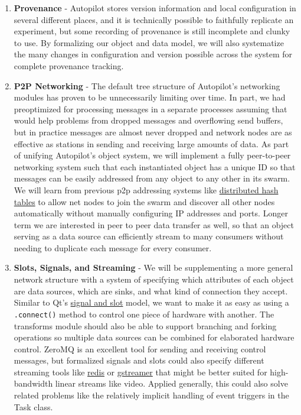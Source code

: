 \begin{enumerate}[ref=\thechapter.\arabic*]
    \item \label{future:provenance}\textbf{Provenance} - Autopilot stores version information and local configuration in several different places, and it is technically possible to faithfully replicate an experiment, but some recording of provenance is still incomplete and clunky to use. By formalizing our object and data model, we will also systematize the many changes in configuration and version possible across the system for complete provenance tracking.
    \item \label{future:network}\textbf{P2P Networking} - The default tree structure of Autopilot's networking modules has proven to be unnecessarily limiting over time. In part, we had preoptimized for processing messages in a separate processes assuming that would help problems from dropped messages and overflowing send buffers, but in practice messages are almost never dropped and network nodes are as effective as stations in sending and receiving large amounts of data. As part of unifying Autopilot's object system, we will implement a fully peer-to-peer networking system such that each instantiated object has a unique ID so that messages can be easily addressed from any object to any other in its swarm. We will learn from previous p2p addressing systems like \href{https://en.wikipedia.org/wiki/Distributed\_hash\_table}{distributed hash tables} to allow net nodes to join the swarm and discover all other nodes automatically without manually configuring IP addresses and ports. Longer term we are interested in peer to peer data transfer as well, so that an object serving as a data source can efficiently stream to many consumers without needing to duplicate each message for every consumer.
    \item \label{future:slots}\textbf{Slots, Signals, and Streaming} - We will be supplementing a more general network structure with a system of specifying which attributes of each object are data sources, which are sinks, and what kind of connection they accept. Similar to Qt's \href{https://doc.qt.io/qt-6/signalsandslots.html}{signal and slot} model, we want to make it as easy as using a \texttt{.connect()} method to control one piece of hardware with another. The transforms module should also be able to support branching and forking operations so multiple data sources can be combined for elaborated hardware control. ZeroMQ is an excellent tool for sending and receiving control messages, but formalized signals and slots could also specify different streaming tools like \href{https://redis.io/}{redis} or \href{https://gstreamer.freedesktop.org/}{gstreamer} that might be better suited for high-bandwidth linear streams like video. Applied generally, this could also solve related problems like the relatively implicit handling of event triggers in the Task class.

\end{enumerate}
